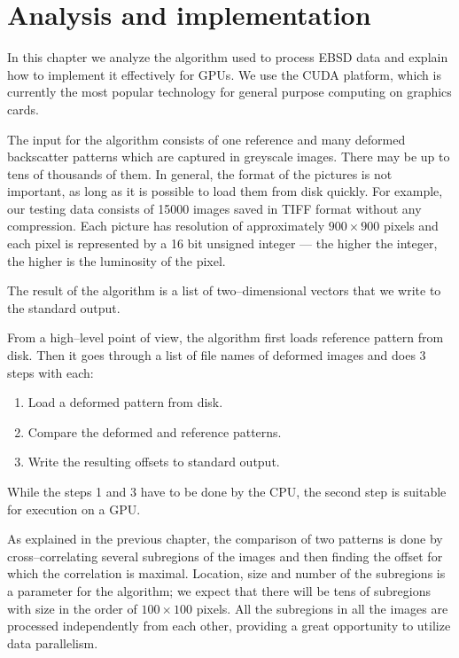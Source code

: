 \chapter{Analysis and implementation}

In this chapter we analyze the algorithm used to process EBSD data and explain how to implement it effectively for GPUs. We use the CUDA platform, which is currently the most popular technology for general purpose computing on graphics cards.


The input for the algorithm consists of one reference and many deformed backscatter patterns which are captured in greyscale images. There may be up to tens of thousands of them. In general, the format of the pictures is not important, as long as it is possible to load them from disk quickly. For example, our testing data consists of 15000 images saved in TIFF format without any compression. Each picture has resolution of approximately $900 \times 900$ pixels and each pixel is represented by a 16 bit unsigned integer --- the higher the integer, the higher is the luminosity of the pixel.

The result of the algorithm is a list of two--dimensional vectors that we write to the standard output.

From a high--level point of view, the algorithm first loads reference pattern from disk. Then it goes through a list of file names of deformed images and does 3 steps with each:
\begin{enumerate}
	\item Load a deformed pattern from disk.
	\item Compare the deformed and reference patterns.
	\item Write the resulting offsets to standard output.
\end{enumerate}
While the steps 1 and 3 have to be done by the CPU, the second step is suitable for execution on a GPU.

As explained in the previous chapter, the comparison of two patterns is done by cross--correlating several subregions of the images and then finding the offset for which the correlation is maximal. Location, size and number of the subregions is a parameter for the algorithm; we expect that there will be tens of subregions with size in the order of $100 \times 100$ pixels. All the subregions in all the images are processed independently from each other, providing a great opportunity to utilize data parallelism.

